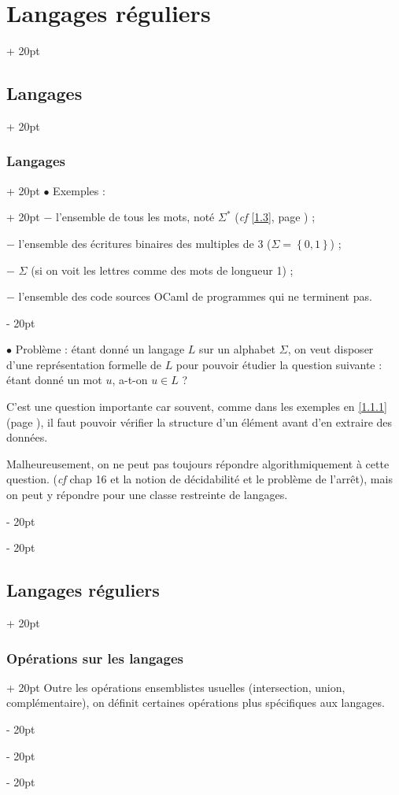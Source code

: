 \documentclass[a4paper, 12pt, twoside]{article}
\newcommand{\set}[1]{\left\{ #1 \right\}}
\newcommand{\ind}[1][20pt]{\advance\leftskip + #1}
\newcommand{\deind}[1][20pt]{\advance\leftskip - #1}
\newenvironment{indt}[2][20pt]{#2 \par \ind[#1]}{\par \deind} %
\begin{document}
\begin{indt}{\section{Langages réguliers}}
\begin{indt}{\subsection{Langages}}
\begin{indt}{\subsubsection{Langages}}
                \begin{indt}{$\bullet$ Exemples :}
                    $-$ l'ensemble de tous les mots, noté $\Sigma^*$ (\textit{cf} \ref{1.3}, page \pageref{1.3}) ;

                    $-$ l'ensemble des écritures binaires des multiples de 3 ($\Sigma = \set{0, 1}$) ;

                    $-$ $\Sigma$ (si on voit les lettres comme des mots de longueur 1) ;

                    $-$ l'ensemble des code sources OCaml de programmes qui ne terminent pas.
                \end{indt}

                \vspace{12pt}
                
                $\bullet$ Problème : étant donné un langage $L$ sur un alphabet $\Sigma$, on veut disposer d'une représentation formelle de $L$ pour pouvoir étudier la question suivante :
                étant donné un mot $u$, a-t-on $u \in L$ ?

                \vspace{6pt}
                
                C'est une question importante car souvent, comme dans les exemples en \ref{1.1.1} (page \pageref{1.1.1}), il faut pouvoir vérifier la structure d'un élément avant d'en extraire des données.

                Malheureusement, on ne peut pas toujours répondre algorithmiquement à cette question. (\textit{cf} chap 16 et la notion de décidabilité et le problème de l'arrêt), mais on peut y répondre pour une classe restreinte de langages.
            \end{indt}
        \end{indt}

        \vspace{12pt}
        
        \begin{indt}{\subsection{Langages réguliers}}
            \label{1.3}

            \begin{indt}{\subsubsection{Opérations sur les langages}}
                Outre les opérations ensemblistes usuelles (intersection, union, complémentaire), on définit certaines opérations plus spécifiques aux langages.


\end{indt}
\end{indt}
\end{indt}
\end{document}
